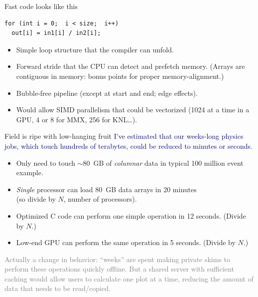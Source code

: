 \documentclass{beamer}
\begin{document}
\begin{frame}[fragile]{Fast code looks like this}
\begin{center}
\begin{minipage}{0.7\linewidth}
\begin{verbatim}
for (int i = 0;  i < size;  i++)
  out[i] = in1[i] / in2[i];
\end{verbatim}
\end{minipage}
\end{center}

\begin{itemize}
\item Simple loop structure that the compiler can unfold.
\item Forward stride that the CPU can detect and prefetch memory. (Arrays are contiguous in memory: bonus points for proper memory-alignment.)
\item Bubble-free pipeline (except at start and end; edge effects).
\item Would allow SIMD parallelism that could be vectorized (1024 at a time in a GPU, 4 or 8 for MMX, 256 for KNL\ldots).
\end{itemize}
\end{frame}

\begin{frame}{Field is ripe with low-hanging fruit}
\vspace{0.5 cm}
\textcolor{darkblue}{I've estimated that our weeks-long physics jobs, which touch hundreds of terabytes, could be reduced to minutes or seconds.}
\begin{itemize}
\item Only need to touch $\sim$80~GB of {\it columnar} data in typical 100 million event example.
\item {\it Single} processor can load 80~GB data arrays in 20 minutes \\ (so divide by $N$, number of processors).
\item Optimized C code can perform one simple operation in 12 seconds. (Divide by $N$.)
\item Low-end GPU can perform the same operation in 5 seconds. (Divide by $N$.)
\end{itemize}

\vspace{0.5 cm}
\small
\textcolor{gray}{Actually a change in behavior: ``weeks'' are spent making private skims to perform these operations quickly offline. But a shared server with sufficient caching would allow users to calculate one plot at a time, reducing the amount of data that needs to be read/copied.}
\end{frame}
\end{document}
